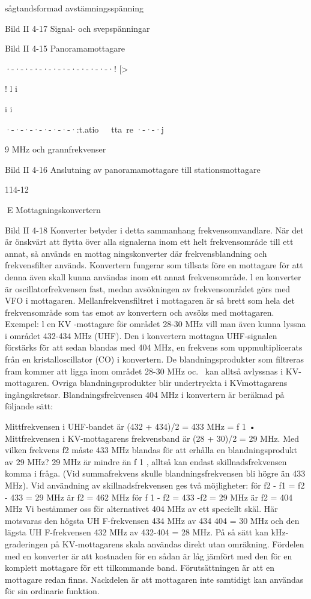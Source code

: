 sågtandsformad avstämningsspänning

Bild II 4-17 Signal- och svepspänningar

Bild II 4-15 Panoramamottagare

·-·-·-·-·-·-·-·-·-·-·-·!
[>

!
l
i

i
i

·-·-·-·-·-·-·-·:t.atio~~~tta~re ·-·-·j

9 MHz och
grannfrekvenser

Bild II 4-16 Anslutning av panoramamottagare till stationsmottagare

114-12

E
Mottagningskonvertern

Bild II 4-18
Konverter betyder i detta sammanhang frekvensomvandlare. När det är önskvärt att
flytta över alla signalerna inom ett helt frekvensområde till ett annat, så används en
mottag ningskonverter där frekvensblandning och frekvensfilter används.
Konvertern fungerar som tillsats före en
mottagare för att denna även skall kunna
användas inom ett annat frekvensområde. l
en konverter är oscillatorfrekvensen fast,
medan avsökningen av frekvensområdet
görs med VFO i mottagaren. Mellanfrekvensfiltret i mottagaren är så brett som hela
det frekvensområde som tas emot av konvertern och avsöks med mottagaren.
Exempel: l en KV -mottagare för området
28-30 MHz vill man även kunna lyssna i
området 432-434 MHz (UHF). Den i konvertern mottagna UHF-signalen förstärks för
att sedan blandas med 404 MHz, en frekvens som uppmultiplicerats från en kristalloscillator (CO) i konvertern. De blandningsprodukter som filtreras fram kommer att
ligga inom området 28-30 MHz oc.~ kan
alltså avlyssnas i KV-mottagaren. Ovriga
blandningsprodukter blir undertryckta i KVmottagarens ingångskretsar.
Blandningsfrekvensen 404 MHz i konvertern är beräknad på följande sätt:

Mittfrekvensen i UHF-bandet är
(432 + 434)/2 = 433 MHz = f 1 •
Mittfrekvensen i KV-mottagarens frekvensband är (28 + 30)/2 = 29 MHz.
Med vilken frekvens f2 måste 433 MHz
blandas för att erhålla en blandningsprodukt
av 29 MHz? 29 MHz är mindre än f 1 , alltså
kan endast skillnadsfrekvensen komma i
fråga. (Vid summafrekvens skulle blandningsfrekvensen bli högre än 433 MHz).
Vid användning av skillnadsfrekvensen
ges två möjligheter:
för f2 - f1 = f2 - 433 = 29 MHz är f2 = 462 MHz
för f 1 - f2 = 433 -f2 = 29 MHz är f2 = 404 MHz
Vi bestämmer oss för alternativet 404
MHz av ett speciellt skäl. Här motsvaras den
högsta UH F-frekvensen 434 MHz av 434 404 = 30 MHz och den lägsta UH F-frekvensen 432 MHz av 432-404 = 28 MHz. På så
sätt kan kHz-graderingen på KV-mottagarens skala användas direkt utan omräkning.
Fördelen med en konverter är att kostnaden för en sådan är låg jämfört med den
för en komplett mottagare för ett tilkommande
band. Förutsättningen är att en mottagare
redan finns.
Nackdelen är att mottagaren inte samtidigt kan användas för sin ordinarie funktion.

